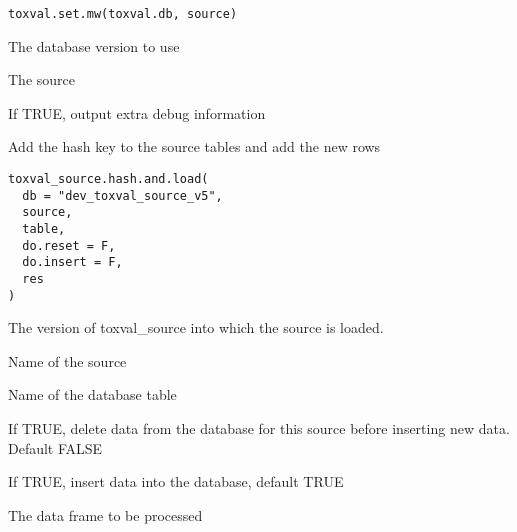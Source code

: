 \documentclass[letterpaper]{book}
\begin{document}
%
\begin{Usage}
\begin{verbatim}
toxval.set.mw(toxval.db, source)
\end{verbatim}
\end{Usage}
%
\begin{Arguments}
\begin{ldescription}
\item[\code{toxval.db}] The database version to use

\item[\code{source}] The source

\item[\code{verbose}] If TRUE, output extra debug information
\end{ldescription}
\end{Arguments}
%
\begin{Description}\relax
Add the hash key to the source tables and add the new rows
\end{Description}
%
\begin{Usage}
\begin{verbatim}
toxval_source.hash.and.load(
  db = "dev_toxval_source_v5",
  source,
  table,
  do.reset = F,
  do.insert = F,
  res
)
\end{verbatim}
\end{Usage}
%
\begin{Arguments}
\begin{ldescription}
\item[\code{db}] The version of toxval\_source into which the source is loaded.

\item[\code{source}] Name of the source

\item[\code{table}] Name of the database table

\item[\code{do.reset}] If TRUE, delete data from the database for this source before
inserting new data. Default FALSE

\item[\code{do.insert}] If TRUE, insert data into the database, default TRUE

\item[\code{res}] The data frame to be processed
\end{ldescription}
\end{Arguments}
\printindex{}
\end{document}
